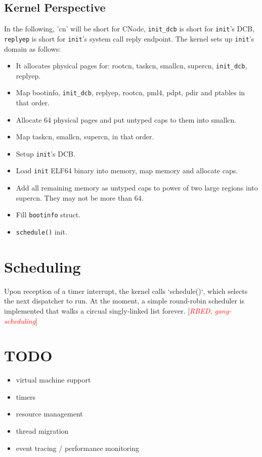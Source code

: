 \documentclass[a4paper,11pt,twoside]{report}
\newcommand{\todo}[1]{[\textcolor{red}{\emph{#1}}]}
\begin{document}
\subsection{Kernel Perspective}

In the following, 'cn' will be short for CNode, \lstinline+init_dcb+ is short
for \lstinline+init+'s DCB, \lstinline+replyep+ is short for \lstinline+init+'s system call reply
endpoint. The kernel sets up \lstinline+init+'s domain as follows:

\begin{itemize}
\item It allocates physical pages for: rootcn, taskcn, smallcn,
supercn, \lstinline+init_dcb+, replyep.
\item Map bootinfo, \lstinline+init_dcb+, replyep, rootcn, pml4, pdpt, pdir and
ptables in that order.
\item Allocate 64 physical pages and put untyped caps to them into
smallcn.
\item Map taskcn, smallcn, supercn, in that order.
\item Setup \lstinline+init+'s DCB.
\item Load \lstinline+init+ ELF64 binary into memory, map memory and allocate
caps.
\item Add all remaining memory as untyped caps to power of two large
regions into supercn. They may not be more than 64.
\item Fill \lstinline+bootinfo+ struct.
\item \lstinline+schedule()+ init.
\end{itemize}

\section{Scheduling}

Upon reception of a timer interrupt, the kernel calls `schedule()`,
which selects the next dispatcher to run. At the moment, a simple
round-robin scheduler is implemented that walks a circual
singly-linked list forever.
\todo{RBED, gang-scheduling}


\section{TODO}
\begin{itemize}
\item virtual machine support
\item timers
\item resource management
\item thread migration
\item event tracing / performance monitoring
\end{itemize}
\end{document}
